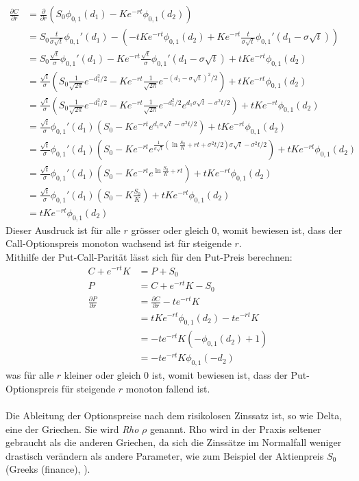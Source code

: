 \documentclass[11pt]{report} %
\newcommand\pd[2]{\displaystyle\frac{\partial #1}{\partial #2}}
\begin{document}
    \begin{align*}
    \pd{C}{r}&=\frac{\partial}{\partial r}\left(S_0\phi_{0, 1}(d_1)-Ke^{-rt}\phi_{0, 1}(d_2)\right)\\
    &=S_0\frac{t}{\sigma\sqrt{t}}\phi_{0, 1}'(d_1)-\left(-tKe^{-rt}\phi_{0, 1}(d_2)+Ke^{-rt}\frac{t}{\sigma\sqrt{t}}\phi_{0, 1}'(d_1-\sigma\sqrt{t})\right)\\
    &=S_0\frac{\sqrt{t}}{\sigma}\phi_{0, 1}'(d_1)-Ke^{-rt}\frac{\sqrt{t}}{\sigma}\phi_{0, 1}'(d_1-\sigma\sqrt{t})+tKe^{-rt}\phi_{0, 1}(d_2)\\
    &=\frac{\sqrt{t}}{\sigma}\left(S_0\frac{1}{\sqrt{2\pi}}e^{-d_1^2/2}-Ke^{-rt}\frac{1}{\sqrt{2\pi}}e^{-(d_1-\sigma\sqrt{t})^2/2}\right)+tKe^{-rt}\phi_{0, 1}(d_2)\\
    &=\frac{\sqrt{t}}{\sigma}\left(S_0\frac{1}{\sqrt{2\pi}}e^{-d_1^2/2}-Ke^{-rt}\frac{1}{\sqrt{2\pi}}e^{-d_1^2/2}e^{d_1\sigma\sqrt{t}- \sigma^2t/2}\right)+tKe^{-rt}\phi_{0, 1}(d_2)\\
    &=\frac{\sqrt{t}}{\sigma}\phi_{0, 1}'(d_1)\left(S_0-Ke^{-rt}e^{d_1\sigma\sqrt{t}-\sigma^2t/2}\right)+tKe^{-rt}\phi_{0, 1}(d_2)\\
    &=\frac{\sqrt{t}}{\sigma}\phi_{0, 1}'(d_1)\left(S_0-Ke^{-rt}e^{\frac{1}{\sigma \sqrt{t}}(\ln{\frac{S_0}{K}}+rt+\sigma^2t/2)\sigma\sqrt{t}-\sigma^2t/2}\right)+tKe^{-rt}\phi_{0, 1}(d_2)\\
    &=\frac{\sqrt{t}}{\sigma}\phi_{0, 1}'(d_1)\left(S_0-Ke^{-rt}e^{\ln{\frac
    {S_0}{K}}+rt}\right)+tKe^{-rt}\phi_{0, 1}(d_2)\\
    &=\frac{\sqrt{t}}{\sigma}\phi_{0, 1}'(d_1)\left(S_0-K\frac{S_0}{K}\right)+tKe^{-rt}\phi_{0, 1}(d_2)\\
    &=tKe^{-rt}\phi_{0, 1}(d_2)
\end{align*}
Dieser Ausdruck ist für alle $r$ grösser oder gleich 0, womit bewiesen ist, dass der Call-Optionspreis monoton wachsend ist für steigende $r$. \\Mithilfe der Put-Call-Parität lässt sich für den Put-Preis berechnen:
    \begin{align*}
    C+e^{-rt}K&=P+S_0\\
    P&=C+e^{-rt}K-S_0\\
    \pd{P}{r}&=\pd{C}{r}-te^{-rt}K\\
    &=tKe^{-rt}\phi_{0, 1}(d_2)-te^{-rt}K\\
    &=-te^{-rt}K(-\phi_{0, 1}(d_2)+1)\\
    &=-te^{-rt}K\phi_{0, 1}(-d_2)
\end{align*}
was für alle $r$ kleiner oder gleich 0 ist, womit bewiesen ist, dass der Put-Optionspreis für steigende $r$ monoton fallend ist. \\\\Die Ableitung der Optionspreise nach dem risikolosen Zinssatz ist, so wie Delta, eine der Griechen. Sie wird \textit{Rho} $\rho$ genannt. Rho wird in der Praxis seltener gebraucht als die anderen Griechen, da sich die Zinssätze im Normalfall weniger drastisch verändern als andere Parameter, wie zum Beispiel der Aktienpreis $S_0$ (Greeks (finance), \cite{wikigreek2024}).
\end{document}
